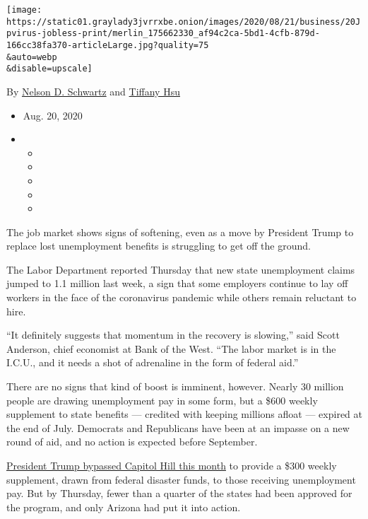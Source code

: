 \texttt{[image: https://static01.graylady3jvrrxbe.onion/images/2020/08/21/business/20Jpvirus-jobless-print/merlin\_175662330\_af94c2ca-5bd1-4cfb-879d-166cc38fa370-articleLarge.jpg?quality=75\\\&auto=webp\\\&disable=upscale]}

By \href{https://www.nytimes3xbfgragh.onion/by/nelson-d-schwartz}{Nelson
D. Schwartz} and
\href{https://www.nytimes3xbfgragh.onion/by/tiffany-hsu}{Tiffany Hsu}

\begin{itemize}
\item
  Aug. 20, 2020
\item
  \begin{itemize}
  \item
  \item
  \item
  \item
  \item
  \end{itemize}
\end{itemize}

The job market shows signs of softening, even as a move by President
Trump to replace lost unemployment benefits is struggling to get off the
ground.

The Labor Department reported Thursday that new state unemployment
claims jumped to 1.1 million last week, a sign that some employers
continue to lay off workers in the face of the coronavirus pandemic
while others remain reluctant to hire.

``It definitely suggests that momentum in the recovery is slowing,''
said Scott Anderson, chief economist at Bank of the West. ``The labor
market is in the I.C.U., and it needs a shot of adrenaline in the form
of federal aid.''

There are no signs that kind of boost is imminent, however. Nearly 30
million people are drawing unemployment pay in some form, but a \$600
weekly supplement to state benefits --- credited with keeping millions
afloat --- expired at the end of July. Democrats and Republicans have
been at an impasse on a new round of aid, and no action is expected
before September.

\href{https://www.whitehouse.gov/presidential-actions/memorandum-authorizing-needs-assistance-program-major-disaster-declarations-related-coronavirus-disease-2019/}{President
Trump bypassed Capitol Hill this month} to provide a \$300 weekly
supplement, drawn from federal disaster funds, to those receiving
unemployment pay. But by Thursday, fewer than a quarter of the states
had been approved for the program, and only Arizona had put it into
action.

